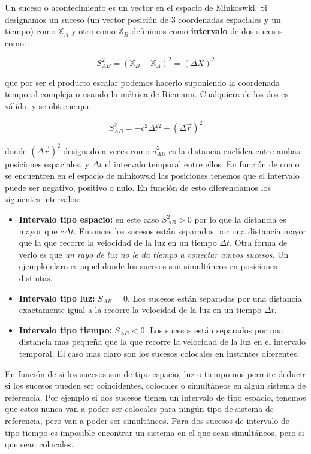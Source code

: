 \documentclass[12pt,a4paper]{book}
\begin{document}
Un suceso o acontecimiento es un vector en el espacio de Minkoswki. Si designamos un suceso (un vector posición de 3 coordenadas espaciales y un tiempo) como $\mathbb{X}_A$ y otro como $\mathbb{X}_B$ definimos como \textbf{intervalo} de dos sucesos como:

\begin{equation}
S_{AB}^2 = (\mathbb{X}_B - \mathbb{X}_A)^2 = (\Delta X)^2 
\end{equation}

que por ser el producto escalar podemos hacerlo suponiendo la coordenada temporal compleja o usando la métrica de Riemann. Cualquiera de los dos es válido, y se obtiene que:

\begin{equation}
S_{AB}^2 = -c^2 \Delta t^2 + (\Delta \vec{r})^2 
\end{equation}

donde $(\Delta \vec{r})^2 $ designado a veces como $d_{AB}^2$ es la distancia euclídea entre ambas posiciones espaciales, y $\Delta t$ el intervalo temporal entre ellos. En función de como se encuentren en el espacio de minkowski las posiciones tenemos que el intervalo puede ser negativo, positivo o nulo. En función de esto diferenciamos los siguientes intervalos:

\begin{itemize}
\item \textbf{Intervalo tipo espacio:} en este caso $S_{AB}^2 > 0$ por lo que la distancia es mayor que $c \Delta t$.  Entonces los sucesos están separados por una distancia mayor que la que recorre la velocidad de la luz en un tiempo $\Delta t$. Otra forma de verlo es que \textit{un rayo de luz no le da tiempo a conectar ambos sucesos}. Un ejemplo claro es aquel donde los sucesos son simultáneos en posiciones distintas.
\item \textbf{Intervalo tipo luz:}  $ S_{AB} = 0 $. Los sucesos están separados por una distancia exactamente igual a la recorre la velocidad de la luz en un tiempo $\Delta t$. 
\item \textbf{Intervalo tipo tiempo:} $S_{AB} < 0$. Los sucesos están separados por una distancia mas pequeña que la que recorre la velocidad de la luz en el intervalo temporal. El caso mas claro son los sucesos colocales en instantes diferentes.
\end{itemize}
 
En función de si los sucesos son de tipo espacio, luz o tiempo nos permite deducir si los sucesos pueden ser coincidentes, colocales o simultáneos en algún sistema de referencia. Por ejemplo si dos sucesos tienen un intervalo de tipo espacio, tenemos que estos nunca van a poder ser colocales para ningún tipo de sistema de referencia, pero van a poder ser simultáneos. Para dos sucesos de intervalo de tipo tiempo es imposible encontrar un sistema en el que sean simultáneos, pero si que sean colocales. 
\end{document}
